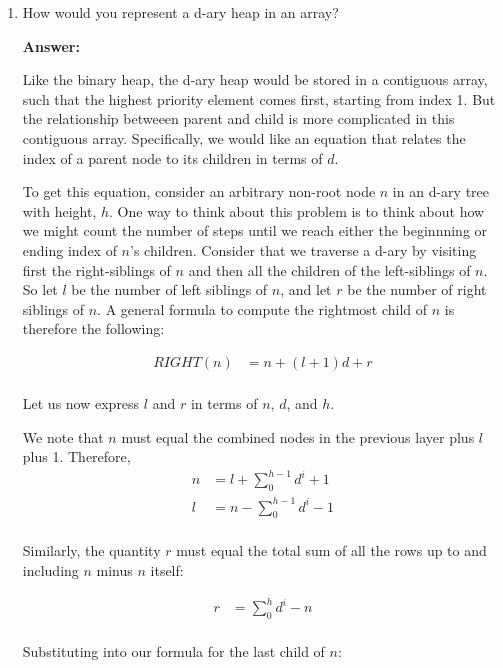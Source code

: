 \documentclass[]{book}
\theoremstyle{definition}
\begin{document}
\begin{enumerate}
    \item How would you represent a d-ary heap in an array?
    
    \textbf{Answer:} 
    
    Like the binary heap, the d-ary heap would be stored 
    in a contiguous array, such that the highest priority element comes first, 
    starting from index 1. But the relationship betweeen
    parent and child is more complicated in this contiguous array. Specifically,
    we would like an equation that relates the index of a parent node to its
    children in terms of $d$.

    To get this equation, consider an arbitrary non-root node $n$ in an d-ary tree with height, $h$.
    One way to think about this problem is to think about how we might count the number of
    steps until we reach either the beginnning or ending index of $n$'s children. 
    Consider that we traverse a d-ary by visiting first the right-siblings of $n$ and 
    then all the children of the left-siblings of $n$. So let $l$ be the number of left siblings
    of $n$, and let $r$ be the number of right siblings of $n$. A general formula
    to compute the rightmost child of $n$ is therefore the following:

    \begin{align*}
        RIGHT(n) &= n + (l+1)d + r \\
    \end{align*}

    Let us now express $l$ and $r$ in terms of $n$, $d$, and $h$.

    We note that $n$ must equal the combined nodes in the previous layer plus $l$ plus 1.
    Therefore, 
    \begin{align*}
        n &= l + \sum_0^{h - 1} d^i + 1\\
        l &= n - \sum_0^{h - 1} d^i - 1\\
    \end{align*}

    Similarly, the quantity $r$ must equal the total sum of all the rows up to and
    including $n$ minus $n$ itself:

    \begin{align*}
        r &= \sum_0^h d^i - n \\
    \end{align*}

    Substituting into our formula for the last child of $n$:


\end{enumerate}
\end{document}
